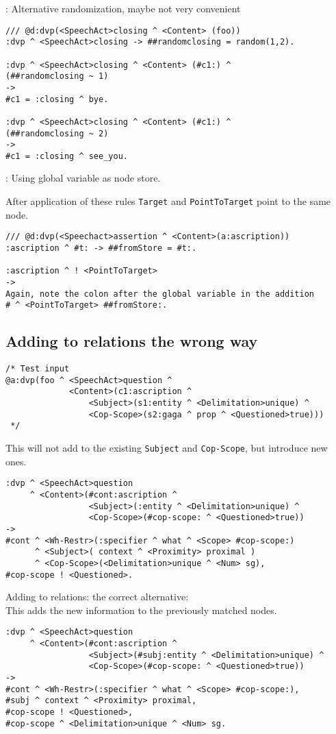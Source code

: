 \newpage{}: Alternative randomization, maybe not very convenient
\begin{verbatim}
/// @d:dvp(<SpeechAct>closing ^ <Content> (foo))
:dvp ^ <SpeechAct>closing -> ##randomclosing = random(1,2).

:dvp ^ <SpeechAct>closing ^ <Content> (#c1:) ^
(##randomclosing ~ 1)
->
#c1 = :closing ^ bye.

:dvp ^ <SpeechAct>closing ^ <Content> (#c1:) ^
(##randomclosing ~ 2)
->
#c1 = :closing ^ see_you.
\end{verbatim}

: Using global variable as node store.

After application of these rules \texttt{Target} and \texttt{PointToTarget}
point to the same node.

\begin{verbatim}
/// @d:dvp(<Speechact>assertion ^ <Content>(a:ascription))
:ascription ^ #t: -> ##fromStore = #t:.

:ascription ^ ! <PointToTarget>
->
Again, note the colon after the global variable in the addition
# ^ <PointToTarget> ##fromStore:.
\end{verbatim}


\subsection{
 Adding to relations the wrong way
}

\begin{verbatim}
/* Test input
@a:dvp(foo ^ <SpeechAct>question ^
             <Content>(c1:ascription ^
                 <Subject>(s1:entity ^ <Delimitation>unique) ^
                 <Cop-Scope>(s2:gaga ^ prop ^ <Questioned>true)))
 */
\end{verbatim}
This will not add to the existing \texttt{Subject} and \texttt{Cop-Scope},
but introduce new ones.
\begin{verbatim}
:dvp ^ <SpeechAct>question
     ^ <Content>(#cont:ascription ^
                 <Subject>(:entity ^ <Delimitation>unique) ^
                 <Cop-Scope>(#cop-scope: ^ <Questioned>true))
->
#cont ^ <Wh-Restr>(:specifier ^ what ^ <Scope> #cop-scope:)
      ^ <Subject>( context ^ <Proximity> proximal )
      ^ <Cop-Scope>(<Delimitation>unique ^ <Num> sg),
#cop-scope ! <Questioned>.
\end{verbatim}

\newpage Adding to relations: the correct alternative:\\
This adds the new information to the previously matched nodes.
\begin{verbatim}
:dvp ^ <SpeechAct>question
     ^ <Content>(#cont:ascription ^
                 <Subject>(#subj:entity ^ <Delimitation>unique) ^
                 <Cop-Scope>(#cop-scope: ^ <Questioned>true))
->
#cont ^ <Wh-Restr>(:specifier ^ what ^ <Scope> #cop-scope:),
#subj ^ context ^ <Proximity> proximal,
#cop-scope ! <Questioned>,
#cop-scope ^ <Delimitation>unique ^ <Num> sg.
\end{verbatim}

